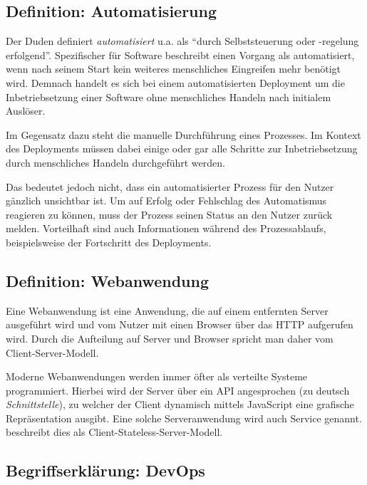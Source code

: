 \subsection{Definition: Automatisierung}

Der Duden \citeyearpar{Duden} definiert \emph{automatisiert} u.a. als ``durch Selbststeuerung oder -regelung erfolgend''. Spezifischer für Software beschreibt \citet[27]{Duvall2007} einen Vorgang als automatisiert, wenn nach seinem Start kein weiteres menschliches Eingreifen mehr benötigt wird. Demnach handelt es sich bei einem automatisierten Deployment um die Inbetriebsetzung einer Software ohne menschliches Handeln nach initialem Auslöser.

Im Gegensatz dazu steht die manuelle Durchführung eines Prozesses. Im Kontext des Deployments müssen dabei einige oder gar alle Schritte zur Inbetriebsetzung durch menschliches Handeln durchgeführt werden.

Das bedeutet jedoch nicht, dass ein automatisierter Prozess für den Nutzer gänzlich unsichtbar ist. Um auf Erfolg oder Fehlschlag des Automatismus reagieren zu können, muss der Prozess seinen Status an den Nutzer zurück melden. Vorteilhaft sind auch Informationen während des Prozessablaufs, beispielsweise der Fortschritt des Deployments. \citep[10f]{Duvall2007}

\subsection{Definition: Webanwendung}

Eine Webanwendung ist eine Anwendung, die auf einem entfernten Server ausgeführt wird und vom Nutzer mit einen Browser über das \ac{HTTP} aufgerufen wird. Durch die Aufteilung auf Server und Browser spricht man daher vom Client-Server-Modell.

Moderne Webanwendungen werden immer öfter als verteilte Systeme programmiert. Hierbei wird der Server über ein \ac{API} angesprochen (zu deutsch \emph{Schnittstelle}), zu welcher der Client dynamisch mittels JavaScript eine grafische Repräsentation ausgibt. Eine solche Serveranwendung wird auch Service genannt. \citet[Kapitel 5.1.3]{Fielding} beschreibt dies als Client-Stateless-Server-Modell.

\subsection{Begriffserklärung: DevOps}
\label{subsec:devops}

